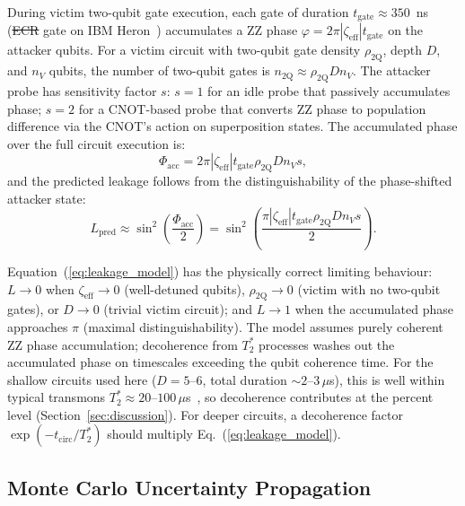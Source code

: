 \documentclass[ASNA,twocolumn]{USG}
\providecommand{\DIFaddtex}[1]{{\protect\color{blue}\uwave{#1}}} %
\providecommand{\DIFdeltex}[1]{{\protect\color{red}\sout{#1}}}                      %
\providecommand{\DIFaddbegin}{} %
\providecommand{\DIFaddend}{} %
\providecommand{\DIFdelbegin}{} %
\providecommand{\DIFdelend}{} %
\providecommand{\DIFadd}[1]{\texorpdfstring{\DIFaddtex{#1}}{#1}} %
\providecommand{\DIFdel}[1]{\texorpdfstring{\DIFdeltex{#1}}{}} %
\begin{document}
During victim two-qubit gate execution, each gate of duration $t_{\mathrm{gate}} \approx 350$~ns (\DIFdelbegin \DIFdel{ECR }\DIFdelend \DIFaddbegin \DIFadd{echoed cross-resonance, ECR, }\DIFaddend gate on IBM Heron~\cite{ibmq2026}) accumulates a ZZ phase $\varphi = 2\pi |\zeta_{\mathrm{eff}}| t_{\mathrm{gate}}$ on the attacker qubits. For a victim circuit with two-qubit gate density $\rho_{\mathrm{2Q}}$, depth $D$, and $n_V$ qubits, the number of two-qubit gates is $n_{\mathrm{2Q}} \approx \rho_{\mathrm{2Q}} D n_V$. The attacker probe has sensitivity factor $s$: $s=1$ for an idle probe that passively accumulates phase; $s=2$ for a CNOT-based probe that converts ZZ phase to population difference via the CNOT's action on superposition states. The accumulated phase over the full circuit execution is:
\begin{equation}
    \Phi_{\mathrm{acc}} = 2\pi |\zeta_{\mathrm{eff}}| t_{\mathrm{gate}} \rho_{\mathrm{2Q}} D n_V s,
\end{equation}
and the predicted leakage follows from the distinguishability of the phase-shifted attacker state:
\begin{equation}
    L_{\mathrm{pred}} \approx \sin^2\left(\frac{\Phi_{\mathrm{acc}}}{2}\right) = \sin^2\left(\frac{\pi |\zeta_{\mathrm{eff}}| t_{\mathrm{gate}} \rho_{\mathrm{2Q}} D n_V s}{2}\right).
\label{eq:leakage_model}
\end{equation}

Equation~(\ref{eq:leakage_model}) has the physically correct limiting behaviour: $L \to 0$ when $\zeta_{\mathrm{eff}} \to 0$ (well-detuned qubits), $\rho_{\mathrm{2Q}} \to 0$ (victim with no two-qubit gates), or $D \to 0$ (trivial victim circuit); and $L \to 1$ when the accumulated phase approaches $\pi$ (maximal distinguishability). The model assumes purely coherent ZZ phase accumulation; decoherence from $T_2^*$ processes washes out the accumulated phase on timescales exceeding the qubit coherence time. For the shallow circuits used here ($D=5$--$6$, total duration $\sim 2$--$3$\,$\mu$s), this is well within typical transmons $T_2^* \approx 20$--$100$\,$\mu$s~\cite{burnett2019decoherence}, so decoherence contributes at the percent level (Section~\ref{sec:discussion}). For deeper circuits, a decoherence factor $\exp(-t_{\mathrm{circ}}/T_2^*)$ should multiply Eq.~(\ref{eq:leakage_model}).

\subsection{Monte Carlo Uncertainty Propagation}
\end{document}
